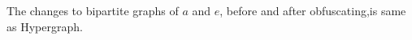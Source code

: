 \documentclass[runningheads,a4paper]{llncs}
\begin{document}
The changes to bipartite graphs of $a$ and $e$, before and after obfuscating,is same as Hypergraph. 



% 
% 
% 
\end{document}
